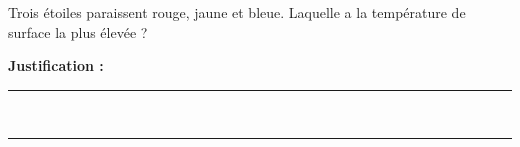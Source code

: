 Trois étoiles paraissent rouge, jaune et bleue. Laquelle a la température de surface la plus élevée ?

\choices

\noindent\textbf{Justification :} \hrulefill \\[2.5ex]
\rule{\linewidth}{0.4pt} \\[2.5ex]
\rule{\linewidth}{0.4pt}
\vfill
